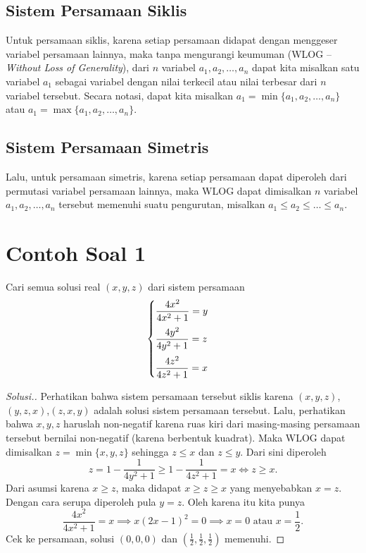 \documentclass[11pt]{scrartcl}
\begin{document}
\subsection{Sistem Persamaan Siklis}
Untuk persamaan siklis, karena setiap persamaan didapat dengan menggeser variabel persamaan lainnya, maka tanpa mengurangi keumuman (WLOG --\textit{ Without Loss of Generality}), dari $n$ variabel $a_1,a_2,\dots,a_n$ dapat kita misalkan satu variabel $a_1$ sebagai variabel dengan nilai terkecil atau nilai terbesar dari $n$ variabel tersebut. Secara notasi, dapat kita misalkan $a_1 = \min\{a_1,a_2,\dots,a_n\}$ atau $a_1 = \max\{a_1,a_2,\dots,a_n\}$. 

\subsection{Sistem Persamaan Simetris}
Lalu, untuk persamaan simetris, karena setiap persamaan dapat diperoleh dari permutasi variabel persamaan lainnya, maka WLOG dapat dimisalkan $n$ variabel $a_1,a_2,\dots,a_n$ tersebut memenuhi suatu pengurutan, misalkan $a_1 \le a_2 \le \dots \le a_n$.


\section{Contoh Soal 1}
\begin{example*}
Cari semua solusi real $(x,y,z)$ dari sistem persamaan\\[-10pt] 
		$$\begin{cases}
			\vspace{2mm}
			\dfrac{4x^2}{4x^2+1}=y \\
			\vspace{2mm}
			\dfrac{4y^2}{4y^2+1}=z \\
			\dfrac{4z^2}{4z^2+1}=x
		\end{cases}$$
\end{example*}
\begin{proof}[Solusi.]
Perhatikan bahwa sistem persamaan tersebut siklis karena $(x,y,z)$,
$(y,z,x)$,$(z,x,y)$ adalah solusi sistem persamaan tersebut. Lalu, perhatikan bahwa $x,y,z$ haruslah non-negatif karena ruas kiri dari masing-masing persamaan tersebut bernilai non-negatif (karena berbentuk kuadrat). Maka WLOG dapat dimisalkan $z = \min\{x,y,z\}$ sehingga $z \le x$ dan $z \le y$. Dari sini diperoleh
$$z=1-\dfrac{1}{4y^2+1} \ge 1-\dfrac{1}{4z^2+1}=x \iff z \ge x.$$
Dari asumsi karena $x \ge z$, maka didapat $x \ge z \ge x$ yang menyebabkan $x=z$. Dengan cara serupa diperoleh pula $y=z$. Oleh karena itu kita punya
$$\dfrac{4x^2}{4x^2+1}=x \implies x(2x-1)^2=0 \implies x=0 \text{ atau } x=\frac{1}{2}.$$
Cek ke persamaan, solusi $(0,0,0)$ dan $(\frac{1}{2}, \frac{1}{2}, \frac{1}{2})$ memenuhi.

\end{proof}
\end{document}

